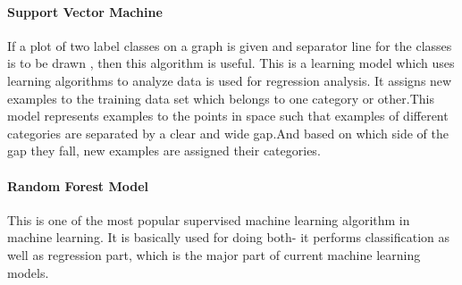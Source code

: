 \paragraph{Support Vector Machine}
 If a plot of two label classes on a graph is given  and separator line for the classes is to be drawn , then this algorithm is useful. This is a learning model which uses learning algorithms to analyze data is used for regression analysis. It assigns new examples to the training data set which belongs to one category or other.This model represents examples to the points in space such that examples of different categories are separated by a clear and wide gap.And based on which side of the gap they fall, new examples are assigned their categories.
\paragraph{Random Forest Model}
This is one of the most popular supervised machine learning algorithm in machine learning. It is basically used for doing both- it performs classification as well as regression part, which is the major part of current machine learning models.\\
